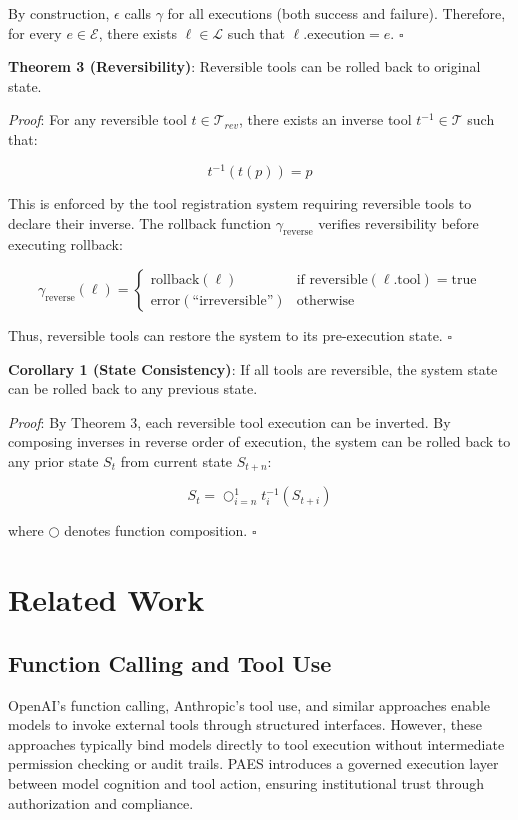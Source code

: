 \documentclass[11pt,a4paper]{article}
\begin{document}
By construction, $\epsilon$ calls $\gamma$ for all executions (both success and failure). Therefore, for every $e \in \mathcal{E}$, there exists $\ell \in \mathcal{L}$ such that $\ell.\text{execution} = e$. $\square$

\textbf{Theorem 3 (Reversibility)}: Reversible tools can be rolled back to original state.

\textit{Proof}: For any reversible tool $t \in \mathcal{T}_{rev}$, there exists an inverse tool $t^{-1} \in \mathcal{T}$ such that:

\[
t^{-1}(t(p)) = p
\]

This is enforced by the tool registration system requiring reversible tools to declare their inverse. The rollback function $\gamma_{\text{reverse}}$ verifies reversibility before executing rollback:

\[
\gamma_{\text{reverse}}(\ell) = \begin{cases}
\text{rollback}(\ell) & \text{if } \text{reversible}(\ell.\text{tool}) = \text{true} \\
\text{error}(\text{``irreversible''}) & \text{otherwise}
\end{cases}
\]

Thus, reversible tools can restore the system to its pre-execution state. $\square$

\textbf{Corollary 1 (State Consistency)}: If all tools are reversible, the system state can be rolled back to any previous state.

\textit{Proof}: By Theorem 3, each reversible tool execution can be inverted. By composing inverses in reverse order of execution, the system can be rolled back to any prior state $S_t$ from current state $S_{t+n}$:

\[
S_t = \bigcirc_{i=n}^{1} t_i^{-1}(S_{t+i})
\]

where $\bigcirc$ denotes function composition. $\square$

\section{Related Work}

\subsection{Function Calling and Tool Use}

OpenAI's function calling, Anthropic's tool use, and similar approaches enable models to invoke external tools through structured interfaces. However, these approaches typically bind models directly to tool execution without intermediate permission checking or audit trails. PAES introduces a governed execution layer between model cognition and tool action, ensuring institutional trust through authorization and compliance.
\end{document}
